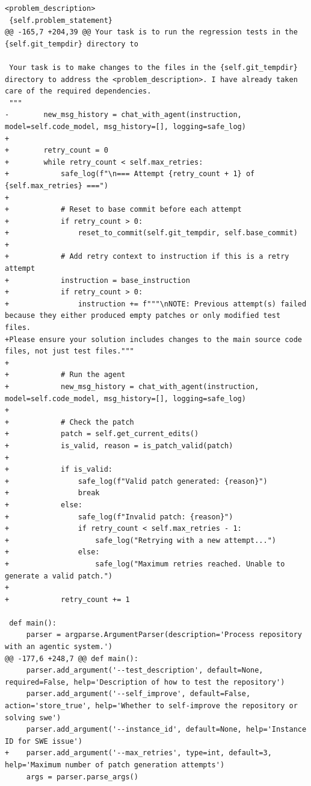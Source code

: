 \documentclass{article}
\begin{document}
\begin{lstlisting}[style=diffstyle]
 <problem_description>
 {self.problem_statement}
@@ -165,7 +204,39 @@ Your task is to run the regression tests in the {self.git_tempdir} directory to
 
 Your task is to make changes to the files in the {self.git_tempdir} directory to address the <problem_description>. I have already taken care of the required dependencies.
 """
-        new_msg_history = chat_with_agent(instruction, model=self.code_model, msg_history=[], logging=safe_log)
+
+        retry_count = 0
+        while retry_count < self.max_retries:
+            safe_log(f"\n=== Attempt {retry_count + 1} of {self.max_retries} ===")
+            
+            # Reset to base commit before each attempt
+            if retry_count > 0:
+                reset_to_commit(self.git_tempdir, self.base_commit)
+            
+            # Add retry context to instruction if this is a retry attempt
+            instruction = base_instruction
+            if retry_count > 0:
+                instruction += f"""\nNOTE: Previous attempt(s) failed because they either produced empty patches or only modified test files. 
+Please ensure your solution includes changes to the main source code files, not just test files."""
+
+            # Run the agent
+            new_msg_history = chat_with_agent(instruction, model=self.code_model, msg_history=[], logging=safe_log)
+            
+            # Check the patch
+            patch = self.get_current_edits()
+            is_valid, reason = is_patch_valid(patch)
+            
+            if is_valid:
+                safe_log(f"Valid patch generated: {reason}")
+                break
+            else:
+                safe_log(f"Invalid patch: {reason}")
+                if retry_count < self.max_retries - 1:
+                    safe_log("Retrying with a new attempt...")
+                else:
+                    safe_log("Maximum retries reached. Unable to generate a valid patch.")
+            
+            retry_count += 1
 
 def main():
     parser = argparse.ArgumentParser(description='Process repository with an agentic system.')
@@ -177,6 +248,7 @@ def main():
     parser.add_argument('--test_description', default=None, required=False, help='Description of how to test the repository')
     parser.add_argument('--self_improve', default=False, action='store_true', help='Whether to self-improve the repository or solving swe')
     parser.add_argument('--instance_id', default=None, help='Instance ID for SWE issue')
+    parser.add_argument('--max_retries', type=int, default=3, help='Maximum number of patch generation attempts')
     args = parser.parse_args()
 

\end{lstlisting}
\end{document}
